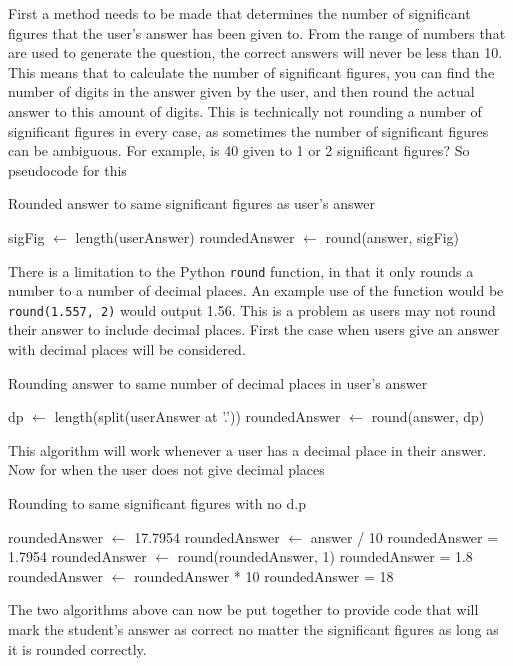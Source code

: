 First a method needs to be made that determines the number of significant figures that the user's answer has been given to. From the range of numbers that are used to generate the question, the correct answers will never be less than 10. This means that to calculate the number of significant figures, you can find the number of digits in the answer given by the user, and then round the actual answer to this amount of digits. This is technically not rounding a number of significant figures in every case, as sometimes the number of significant figures can be ambiguous. For example, is 40 given to 1 or 2 significant figures? So pseudocode for this
\begin{algorithm}
	\caption{Rounded answer to same significant figures as user's answer}
	\begin{algorithmic}[1]
		\State sigFig $\gets$ length(userAnswer)
		\State roundedAnswer $\gets$ round(answer, sigFig)
	\end{algorithmic}
\end{algorithm}
There is a limitation to the Python \texttt{round} function, in that it only rounds a number to a number of decimal places. An example use of the function would be \lstinline|round(1.557, 2)| would output 1.56. This is a problem as users may not round their answer to include decimal places. First the case when users give an answer with decimal places will be considered.
\begin{algorithm}
	\caption{Rounding answer to same number of decimal places in user's answer}
	\begin{algorithmic}[1]
		\State dp $\gets$ length(split(userAnswer at '.'))
		\State roundedAnswer $\gets$ round(answer, dp)
		\EndIf
	\end{algorithmic}
\end{algorithm}
This algorithm will work whenever a user has a decimal place in their answer. Now for when the user does not give decimal places
\begin{algorithm}
	\caption{Rounding to same significant figures with no d.p}
	\begin{algorithmic}[1]
		\State roundedAnswer $\gets$ 17.7954
		\State roundedAnswer $\gets$ answer / 10 \Comment roundedAnswer = 1.7954
		\State roundedAnswer $\gets$ round(roundedAnswer, 1) \Comment roundedAnswer = 1.8
		\State roundedAnswer $\gets$ roundedAnswer * 10 \Comment roundedAnswer = 18
	\end{algorithmic}
\end{algorithm}
The two algorithms above can now be put together to provide code that will mark the student's answer as correct no matter the significant figures as long as it is rounded correctly. \\
